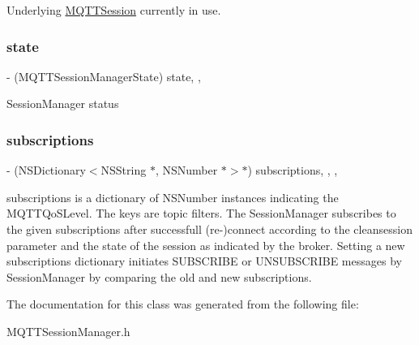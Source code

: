 Underlying \hyperlink{interface_m_q_t_t_session}{M\+Q\+T\+T\+Session} currently in use. \mbox{\label{interface_m_q_t_t_session_manager_a4caf1f5fe21b8d36700d97b68b3bf978}} 
\subsubsection{\texorpdfstring{state}{state}}
{\footnotesize\ttfamily -\/ (M\+Q\+T\+T\+Session\+Manager\+State) state\hspace{0.3cm}{\ttfamily [read]}, {\ttfamily [nonatomic]}, {\ttfamily [assign]}}

Session\+Manager status \mbox{\label{interface_m_q_t_t_session_manager_a58ff79b8f16b7172d6466dfe55927428}} 
\subsubsection{\texorpdfstring{subscriptions}{subscriptions}}
{\footnotesize\ttfamily -\/ (N\+S\+Dictionary$<$N\+S\+String $\ast$, N\+S\+Number $\ast$$>$$\ast$) subscriptions\hspace{0.3cm}{\ttfamily [read]}, {\ttfamily [write]}, {\ttfamily [nonatomic]}, {\ttfamily [strong]}}

subscriptions is a dictionary of N\+S\+Number instances indicating the M\+Q\+T\+T\+Qo\+S\+Level. The keys are topic filters. The Session\+Manager subscribes to the given subscriptions after successfull (re-\/)connect according to the cleansession parameter and the state of the session as indicated by the broker. Setting a new subscriptions dictionary initiates S\+U\+B\+S\+C\+R\+I\+BE or U\+N\+S\+U\+B\+S\+C\+R\+I\+BE messages by Session\+Manager by comparing the old and new subscriptions. 

The documentation for this class was generated from the following file\+:\begin{DoxyCompactItemize}
\item 
M\+Q\+T\+T\+Session\+Manager.\+h\end{DoxyCompactItemize}
